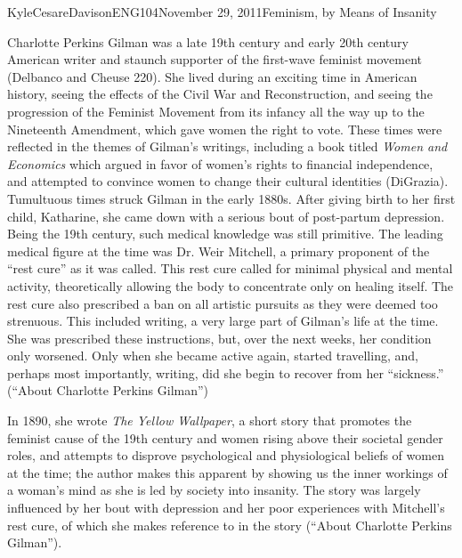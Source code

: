 \documentclass[11pt,letterpaper]{article}
\begin{document}
\begin{mla}{Kyle}{Cesare}{Davison}{ENG104}{November 29, 2011}{Feminism, by Means
of Insanity}

Charlotte Perkins Gilman was a late 19th century and early 20th century American
writer and staunch supporter of the first-wave feminist movement (Delbanco and
Cheuse 220).  She lived during an exciting time in American history, seeing the
effects of the Civil War and Reconstruction, and seeing the progression of the
Feminist Movement from its infancy all the way up to the Nineteenth Amendment,
which gave women the right to vote.  These times were reflected in the themes of
Gilman's writings, including a book titled \emph{Women and Economics} which
argued in favor of women's rights to financial independence, and attempted to
convince women to change their cultural identities (DiGrazia).  Tumultuous times
struck Gilman in the early 1880s.  After giving birth to her first child,
Katharine, she came down with a serious bout of post-partum depression.  Being
the 19th century, such medical knowledge was still primitive.  The leading
medical figure at the time was Dr. Weir Mitchell, a primary proponent of the
``rest cure'' as it was called.  This rest cure called for minimal physical and
mental activity, theoretically allowing the body to concentrate only on healing
itself.  The rest cure also prescribed a ban on all artistic pursuits as they
were deemed too strenuous.  This included writing, a very large part of Gilman's
life at the time.  She was prescribed these instructions, but, over the next
weeks, her condition only worsened.  Only when she became active again, started
travelling, and, perhaps most importantly, writing, did she begin to recover
from her ``sickness.'' (``About Charlotte Perkins Gilman'')

In 1890, she wrote \emph{The Yellow Wallpaper}, a short story that promotes the
feminist cause of the 19th century and women rising above their societal gender
roles, and attempts to disprove psychological and physiological beliefs of women
at the time; the author makes this apparent by showing us the inner workings of
a woman's mind as she is led by society into insanity.  The story was largely
influenced by her bout with depression and her poor experiences with Mitchell's
rest cure, of which she makes reference to in the story (``About Charlotte
Perkins Gilman'').


\end{mla}
\end{document}

